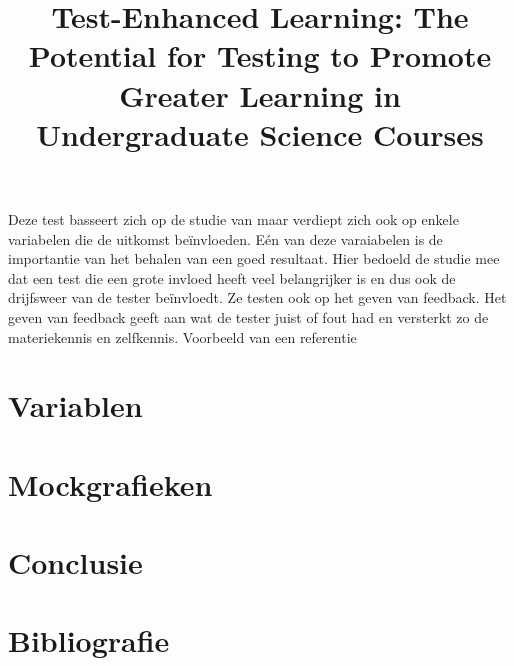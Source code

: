 \documentclass{hogent-article}
\begin{document}
    \title{Test-Enhanced Learning: The Potential for Testing to Promote Greater Learning in Undergraduate Science Courses}
    Deze test basseert zich op de studie van \autocite{} maar verdiept zich ook op enkele variabelen die de uitkomst beïnvloeden. Eén van deze varaiabelen is de importantie van het behalen van een goed resultaat. Hier bedoeld de studie mee dat een test die een grote invloed heeft veel belangrijker is en dus ook de drijfsweer van de tester beïnvloedt.
    Ze testen ook op het geven van feedback. Het geven van feedback geeft aan wat de tester juist of fout had en versterkt zo de materiekennis en zelfkennis.
	Voorbeeld van een referentie~\autocite{Moore2002}
	
	\section{Variablen}
	
	\section{Mockgrafieken}
	
	\section{Conclusie}
	
	\section{Bibliografie}
	
	
	\printbibliography[heading=bibintoc]
	
\end{document}

